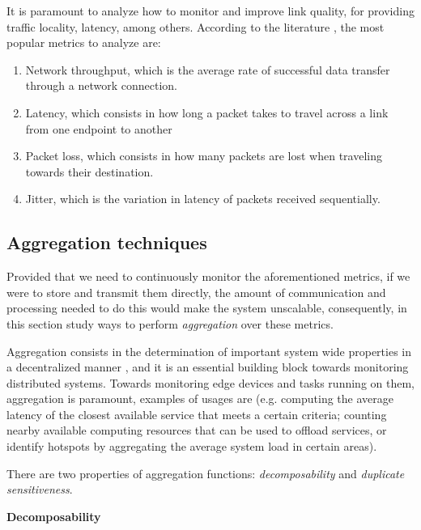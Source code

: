 It is paramount to analyze how to monitor and improve link quality, for providing traffic locality, latency, among others. According to the literature \cite{}, the most popular metrics to analyze are:

\begin{enumerate}

    \item Network throughput, which is the average rate of successful data transfer through a network connection.
    
    \item Latency, which consists in how long a packet takes to travel across a link from one endpoint to another
    
    \item Packet loss, which consists in how many packets are lost when traveling towards their destination.
    
    \item Jitter, which is the variation in latency of packets received sequentially. 
    
\end{enumerate}

\subsection{Aggregation techniques}

Provided that we need to continuously monitor the aforementioned metrics, if we were to store and transmit them directly, the amount of communication and processing needed to do this would make the system unscalable, consequently, in this section study ways to perform \textit{aggregation} over these metrics.

Aggregation consists in the determination of important system wide properties in a decentralized manner \cite{DBLP:journals/corr/abs-1110-0725}, and it is an essential building block towards monitoring distributed systems. Towards monitoring edge devices and tasks running on them, aggregation is paramount, examples of usages are (e.g. computing the average latency of the closest available  service that meets a certain criteria; counting nearby available computing resources that can be used to offload services, or identify hotspots by aggregating the average system load in certain areas).

There are two properties of aggregation functions: \textit{decomposability} and \textit{duplicate sensitiveness}.

\textbf{Decomposability}

